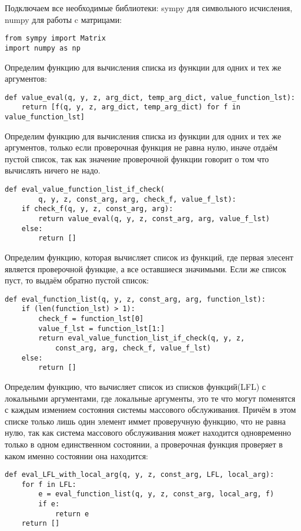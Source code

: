 Подключаем все необходимые библиотеки:
sympy для символьного исчисления,
numpy для работы c матрицами: 
\begin{verbatim}
from sympy import Matrix
import numpy as np
\end{verbatim}

Определим функцию для вычисления списка из функции 
для одних и тех же аргументов:
\begin{verbatim}
def value_eval(q, y, z, arg_dict, temp_arg_dict, value_function_lst):
	return [f(q, y, z, arg_dict, temp_arg_dict) for f in value_function_lst]
\end{verbatim}

Определим функцию для вычисления списка из функции
для одних и тех же аргументов,
только если проверочная функция не равна нулю,
иначе отдаём пустой список, так как значение проверочной функции
говорит о том что вычислять ничего не надо.
\begin{verbatim}
def eval_value_function_list_if_check(
		q, y, z, const_arg, arg, check_f, value_f_lst):
	if check_f(q, y, z, const_arg, arg):
		return value_eval(q, y, z, const_arg, arg, value_f_lst)
	else:
		return []
\end{verbatim}

Определим функцию, которая вычисляет список из функций, где
первая элесент является проверочной функцие, а все оставшиеся
значимыми.
Если же список пуст, то выдаём обратно пустой список:
\begin{verbatim}
def eval_function_list(q, y, z, const_arg, arg, function_lst):
	if (len(function_lst) > 1):
		check_f = function_lst[0]
		value_f_lst = function_lst[1:]
		return eval_value_function_list_if_check(q, y, z,
			const_arg, arg, check_f, value_f_lst)
	else:
		return []
\end{verbatim}

Определим функцию, что вычисляет список из списков функций(LFL)
с локальными аргументами, где локальные аргументы, это
те что могут поменятся с каждым  измением 
состояния системы массового обслуживания.
Причём в этом списке только лишь один элемент
иммет проверучную функцию, что не равна нулю, так как
система массового обслуживания может находится
одновременно только в одном единственном состоянии,
а проверочная функция проверяет в каком именно 
состоянии она находится:
\begin{verbatim}
def eval_LFL_with_local_arg(q, y, z, const_arg, LFL, local_arg):
	for f in LFL:
		e = eval_function_list(q, y, z, const_arg, local_arg, f)
		if e:
			return e
	return []
\end{verbatim}

